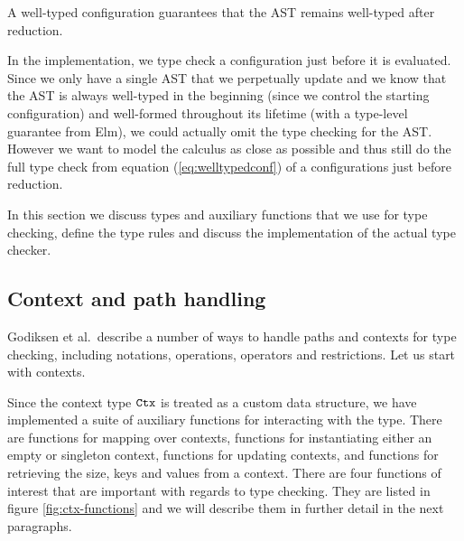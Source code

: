 A well-typed configuration guarantees that the AST remains well-typed after
reduction.

In the implementation, we type check a configuration just before it is
evaluated. Since we only have a single AST that we perpetually update and we
know that the AST is always well-typed in the beginning (since we control the
starting configuration) and well-formed throughout its lifetime (with a
type-level guarantee from Elm), we could actually omit the type checking for
the AST. However we want to model the calculus as close as possible and thus
still do the full type check from equation (\ref{eq:welltypedconf}) of a
configurations just before reduction.

In this section we discuss types and auxiliary functions that we use for type
checking, define the type rules and discuss the implementation of the actual
type checker.

\subsection{Context and path handling}
Godiksen et al.\pepm~describe a number of ways to handle paths and contexts for
type checking, including notations, operations, operators and restrictions.
Let us start with contexts.

Since the context type $\texttt{Ctx}$ is treated as a custom data structure, we
have implemented a suite of auxiliary functions for interacting with the type.
There are functions for mapping over contexts, functions for instantiating
either an empty or singleton context, functions for updating contexts, and
functions for retrieving the size, keys and values from a context. There are
four functions of interest that are important with regards to type checking.
They are listed in figure \ref{fig:ctx-functions} and we will describe them in
further detail in the next paragraphs.

